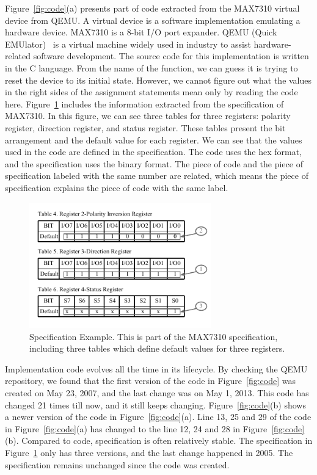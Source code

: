 Figure~\ref{fig:code}(a) presents part of code extracted from the MAX7310 virtual device from QEMU. A virtual device is a software implementation emulating a hardware device. MAX7310 is a 8-bit I/O port expander. QEMU (Quick EMUlator)~\cite{Bellard05} is a virtual machine widely used in industry to assist hardware-related software development. The source code for this implementation is written in the C language. From the name of the function, we can guess it is trying to reset the device to its initial state. However, we cannot figure out what the values in the right sides of the assignment statements mean only by reading the code here. Figure~\ref{fig:spec} includes the information extracted from the specification of MAX7310. In this figure, we can see three tables for three registers: polarity register, direction register, and status register. These tables present the bit arrangement and the default value for each register. We can see that the values used in the code are defined in the specification. The code uses the hex format, and the specification uses the binary format. The piece of code and the piece of specification labeled with the same number are related, which means the piece of specification explains the piece of code with the same label.

\begin{figure}
  \centering
  \includegraphics[width=0.7\textwidth]{spec}
  \caption{Specification Example. This is part of the MAX7310 specification, including three tables which define default values for three registers.}
  \label{fig:spec}
\end{figure}

Implementation code evolves all the time in its lifecycle. By checking the QEMU repository, we found that the first version of the code in Figure~\ref{fig:code} was created on May 23, 2007, and the last change was on May 1, 2013. This code has changed 21 times till now, and it still keeps changing.
Figure~\ref{fig:code}(b) shows a newer version of the code in Figure~\ref{fig:code}(a). Line 13, 25 and 29 of the code in Figure~\ref{fig:code}(a) has changed to the line 12, 24 and 28 in Figure~\ref{fig:code}(b). Compared to code, specification is often relatively stable. The specification in Figure~\ref{fig:spec} only has three versions, and the last change happened in 2005. The specification remains unchanged since the code was created.

